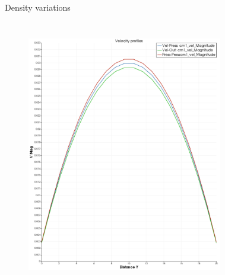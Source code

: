 \documentclass{beamer}
\begin{document}
	\begin{frame}{Density variations}
		\begin{columns}
			\begin{figure}
				\centering
				\includegraphics[width=\textwidth]{pics/velDropBox.png}
				\label{}
			\end{figure}
			
			
			\begin{figure}
				\centering
				

\end{figure}
\end{columns}
\end{frame}
\end{document}
